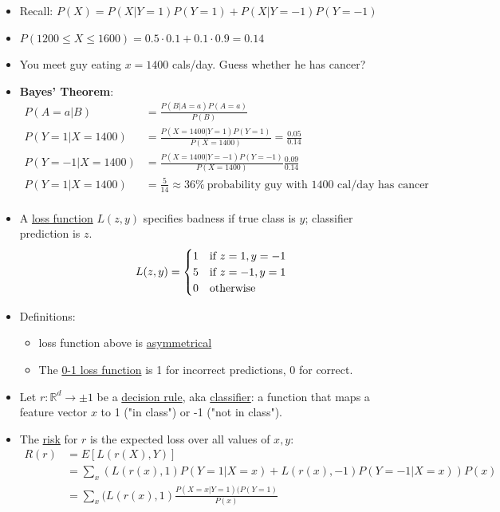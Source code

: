 \documentclass[10pt]{article}
\begin{document}
\begin{itemize}
		\item Recall: $P(X) = P(X|Y=1)P(Y=1) + P(X|Y=-1)P(Y=-1)$
		\item $P(1200 \leq X \leq 1600) = 0.5\cdot 0.1 + 0.1\cdot 0.9 = 0.14$
		\item You meet guy eating $x = 1400$ cals/day. Guess whether he has cancer?
		\item \textbf{Bayes' Theorem}:
			\begin{align*}
				P(A=a|B) &= \frac{P(B|A=a)P(A=a)}{P(B)}\\
				P(Y=1|X=1400) &= \frac{P(X=1400|Y=1)P(Y=1)}{P(X=1400)} = \frac{0.05}{0.14} \\
				P(Y=-1|X=1400) &= \frac{P(X=1400|Y=-1)P(Y=-1)}{P(X=1400)} \frac{0.09}{0.14} \\
				P(Y=1|X=1400) &= \frac{5}{14} \approx 36\% \ \text{probability guy with 1400 cal/day has cancer}\\
			\end{align*}
		\item A \underline{loss function} $L(z, y)$ specifies badness if true class is $y$; classifier prediction is $z$.
			\[
 				L(z, y) = \left\{\def\arraystretch{1.2}%
 					\begin{array}{@{}c@{\quad}l@{}}
    					1 & \text{if $z=1, y=-1$}\\
   						5 & \text{if $z=-1, y=1$}\\
   						0 & \text{otherwise}\\
						\end{array}\right.
			\]
		\item Definitions: 
			\begin{itemize}
				\item loss function above is \underline{asymmetrical}
				\item The \underline{0-1 loss function} is 1 for incorrect predictions, 0 for correct.
			\end{itemize}
		\item Let $r: \mathbb{R}^{d} \rightarrow \pm 1$ be a \underline{decision rule}, aka \underline{classifier}: a function that maps a feature vector $x$ to 1 ("in class") or -1 ("not in class").
		\item The \underline{risk} for $r$ is the expected loss over all values of $x,y$:
			\begin{align*}
				R(r) &= E[L(r(X), Y)]\\
					&= \sum_{x} (L(r(x), 1)P(Y=1|X=x) + L(r(x), -1)P(Y=-1|X=x))P(x)\\
					&= \sum_{x} (L(r(x), 1)\frac{P(X=x|Y=1)(P(Y=1)}{P(x)} 

\end{align*}
\end{itemize}
\end{document}

